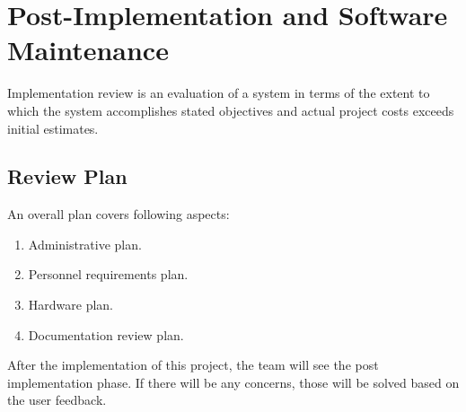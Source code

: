 \section{Post-Implementation and Software Maintenance}
Implementation review is an evaluation of a system in terms of the 
extent to which the system accomplishes stated objectives and actual 
project costs exceeds initial estimates.
\subsection{Review Plan}
An overall plan covers following aspects:
\begin{enumerate}
\item Administrative plan.
\item Personnel requirements plan.
\item Hardware plan.
\item Documentation review plan.
\end{enumerate}
\vskip 0.5cm
After the implementation of this project, the team will see the post 
implementation phase. If there will be any concerns, those will be 
solved based on the user feedback.

